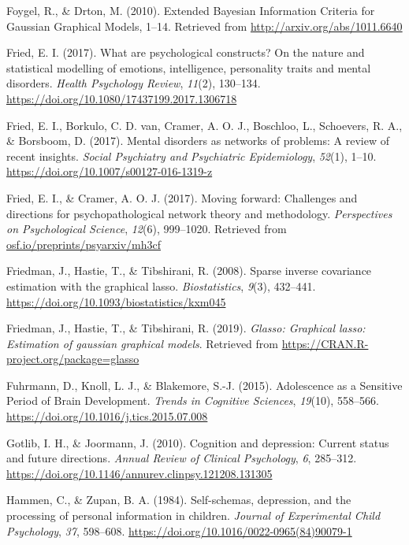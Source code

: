 \documentclass[
  english,
  man,floatsintext]{apa6}
\begin{document}
\leavevmode\hypertarget{ref-foygel_extended_2010}{}%
Foygel, R., \& Drton, M. (2010). Extended Bayesian Information Criteria for Gaussian Graphical Models, 1--14. Retrieved from \url{http://arxiv.org/abs/1011.6640}

\leavevmode\hypertarget{ref-fried_what_2017}{}%
Fried, E. I. (2017). What are psychological constructs? On the nature and statistical modelling of emotions, intelligence, personality traits and mental disorders. \emph{Health Psychology Review}, \emph{11}(2), 130--134. \url{https://doi.org/10.1080/17437199.2017.1306718}

\leavevmode\hypertarget{ref-fried_mental_2017}{}%
Fried, E. I., Borkulo, C. D. van, Cramer, A. O. J., Boschloo, L., Schoevers, R. A., \& Borsboom, D. (2017). Mental disorders as networks of problems: A review of recent insights. \emph{Social Psychiatry and Psychiatric Epidemiology}, \emph{52}(1), 1--10. \url{https://doi.org/10.1007/s00127-016-1319-z}

\leavevmode\hypertarget{ref-fried_moving_2017}{}%
Fried, E. I., \& Cramer, A. O. J. (2017). Moving forward: Challenges and directions for psychopathological network theory and methodology. \emph{Perspectives on Psychological Science}, \emph{12}(6), 999--1020. Retrieved from \url{osf.io/preprints/psyarxiv/mh3cf}

\leavevmode\hypertarget{ref-friedman_sparse_2008}{}%
Friedman, J., Hastie, T., \& Tibshirani, R. (2008). Sparse inverse covariance estimation with the graphical lasso. \emph{Biostatistics}, \emph{9}(3), 432--441. \url{https://doi.org/10.1093/biostatistics/kxm045}

\leavevmode\hypertarget{ref-R-glasso}{}%
Friedman, J., Hastie, T., \& Tibshirani, R. (2019). \emph{Glasso: Graphical lasso: Estimation of gaussian graphical models}. Retrieved from \url{https://CRAN.R-project.org/package=glasso}

\leavevmode\hypertarget{ref-fuhrmann_adolescence_2015}{}%
Fuhrmann, D., Knoll, L. J., \& Blakemore, S.-J. (2015). Adolescence as a Sensitive Period of Brain Development. \emph{Trends in Cognitive Sciences}, \emph{19}(10), 558--566. \url{https://doi.org/10.1016/j.tics.2015.07.008}

\leavevmode\hypertarget{ref-Gotlib2010}{}%
Gotlib, I. H., \& Joormann, J. (2010). Cognition and depression: Current status and future directions. \emph{Annual Review of Clinical Psychology}, \emph{6}, 285--312. \url{https://doi.org/10.1146/annurev.clinpsy.121208.131305}

\leavevmode\hypertarget{ref-Hammen1984}{}%
Hammen, C., \& Zupan, B. A. (1984). Self-schemas, depression, and the processing of personal information in children. \emph{Journal of Experimental Child Psychology}, \emph{37}, 598--608. \url{https://doi.org/10.1016/0022-0965(84)90079-1}
\end{document}
